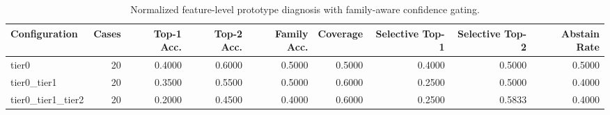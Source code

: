 \begin{table}[t]
\centering
\caption{Normalized feature-level prototype diagnosis with family-aware confidence gating.}
\label{tab:dice_stressor_hierarchical_diagnosis}
\footnotesize
\begin{tabular}{lrrrrrrrr}
\toprule
Configuration & Cases & Top-1 Acc. & Top-2 Acc. & Family Acc. & Coverage & Selective Top-1 & Selective Top-2 & Abstain Rate \\
\midrule
tier0 & 20 & 0.4000 & 0.6000 & 0.5000 & 0.5000 & 0.4000 & 0.5000 & 0.5000 \\
tier0_tier1 & 20 & 0.3500 & 0.5500 & 0.5000 & 0.6000 & 0.2500 & 0.5000 & 0.4000 \\
tier0_tier1_tier2 & 20 & 0.2000 & 0.4500 & 0.4000 & 0.6000 & 0.2500 & 0.5833 & 0.4000 \\
\bottomrule
\end{tabular}

\end{table}
